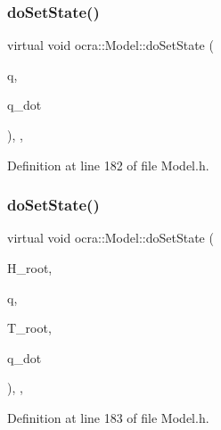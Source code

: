 \subsubsection{\texorpdfstring{do\+Set\+State()}{doSetState()}\hspace{0.1cm}{\footnotesize\ttfamily [1/2]}}
{\footnotesize\ttfamily virtual void ocra\+::\+Model\+::do\+Set\+State (\begin{DoxyParamCaption}\item[{const Eigen\+::\+Vector\+Xd \&}]{q,  }\item[{const Eigen\+::\+Vector\+Xd \&}]{q\+\_\+dot }\end{DoxyParamCaption})\hspace{0.3cm}{\ttfamily [inline]}, {\ttfamily [protected]}, {\ttfamily [virtual]}}



Definition at line 182 of file Model.\+h.

\hypertarget{classocra_1_1Model_adab6b86806c9298ecba14da065badacf}{}\label{classocra_1_1Model_adab6b86806c9298ecba14da065badacf} 
\subsubsection{\texorpdfstring{do\+Set\+State()}{doSetState()}\hspace{0.1cm}{\footnotesize\ttfamily [2/2]}}
{\footnotesize\ttfamily virtual void ocra\+::\+Model\+::do\+Set\+State (\begin{DoxyParamCaption}\item[{const Eigen\+::\+Displacementd \&}]{H\+\_\+root,  }\item[{const Eigen\+::\+Vector\+Xd \&}]{q,  }\item[{const Eigen\+::\+Twistd \&}]{T\+\_\+root,  }\item[{const Eigen\+::\+Vector\+Xd \&}]{q\+\_\+dot }\end{DoxyParamCaption})\hspace{0.3cm}{\ttfamily [inline]}, {\ttfamily [protected]}, {\ttfamily [virtual]}}



Definition at line 183 of file Model.\+h.

\hypertarget{classocra_1_1Model_adf0c6ffce3a2cc8e3d654bf3d6f23b3c}{}\label{classocra_1_1Model_adf0c6ffce3a2cc8e3d654bf3d6f23b3c} 
